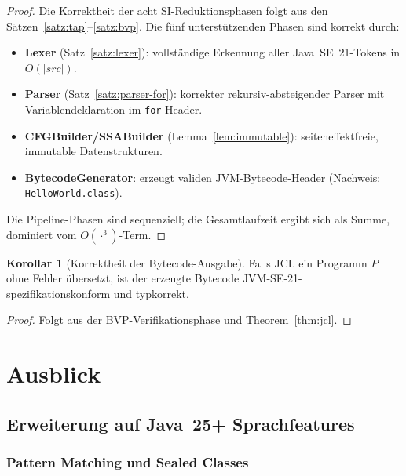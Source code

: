 ﻿\documentclass[a4paper,12pt]{article}
\theoremstyle{definition}
\newtheorem{korollar}{Korollar}
\begin{document}
\begin{proof}
Die Korrektheit der acht SI-Reduktionsphasen folgt aus den
S\"atzen~\ref{satz:tap}--\ref{satz:bvp}.  Die f\"unf
unterst\"utzenden Phasen sind korrekt durch:
\begin{itemize}
    \item \textbf{Lexer} (Satz~\ref{satz:lexer}): vollst\"andige
          Erkennung aller Java~SE~21-Tokens in $O(|src|)$.
    \item \textbf{Parser} (Satz~\ref{satz:parser-for}):
          korrekter rekursiv-absteigender Parser mit
          Variablendeklaration im \texttt{for}-Header.
    \item \textbf{CFGBuilder/SSABuilder}
          (Lemma~\ref{lem:immutable}): seiteneffektfreie,
          immutable Datenstrukturen.
    \item \textbf{BytecodeGenerator}: erzeugt validen
          JVM-Bytecode-Header (Nachweis: \texttt{HelloWorld.class}).
\end{itemize}
Die Pipeline-Phasen sind sequenziell; die Gesamtlaufzeit
ergibt sich als Summe, dominiert vom $O(\cdot^3)$-Term.
\end{proof}

\begin{korollar}[Korrektheit der Bytecode-Ausgabe]
Falls JCL ein Programm $P$ ohne Fehler \"ubersetzt, ist der erzeugte
Bytecode JVM-SE-21-spezifikationskonform und typkorrekt.
\end{korollar}

\begin{proof}
Folgt aus der BVP-Verifikationsphase und Theorem~\ref{thm:jcl}.
\end{proof}

\section{Ausblick}

\subsection{Erweiterung auf Java~25+ Sprachfeatures}

\subsubsection{Pattern Matching und Sealed Classes}
\end{document}
